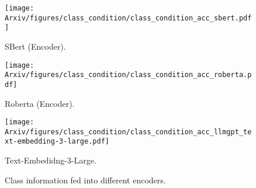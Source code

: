 \begin{wrapfigure}{r}{0.55\textwidth}
    \centering
    \vspace{-0.2cm}
    \begin{minipage}{0.17\textwidth}
    \captionsetup{labelformat=empty}
        \centering
        \texttt{[image: Arxiv/figures/class\_condition/class\_condition\_acc\_sbert.pdf]}
        \vspace{-0.5cm}
        \caption*{\scriptsize SBert (Encoder).}
    \end{minipage}
    \begin{minipage}{0.17\textwidth}
    \captionsetup{labelformat=empty}
        \centering
        \texttt{[image: Arxiv/figures/class\_condition/class\_condition\_acc\_roberta.pdf]}
        \vspace{-0.5cm}
        \caption*{\scriptsize Roberta (Encoder).}
    \end{minipage}
    \begin{minipage}{0.17\textwidth}
    \captionsetup{labelformat=empty}
        \centering
        \texttt{[image: Arxiv/figures/class\_condition/class\_condition\_acc\_llmgpt\_text-embedding-3-large.pdf]}
        \vspace{-0.5cm}
        \caption*{\scriptsize  Text-Embedidng-3-Large.}
    \end{minipage}
    \vspace{-0.2cm}
    \caption{Class information fed into different encoders.}
    \label{fig:class_condition}
    \vspace{-0.6cm}
\end{wrapfigure}